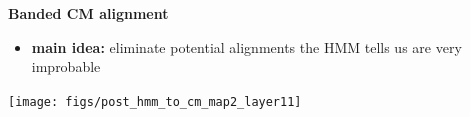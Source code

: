 \documentclass[landscape]{slides}
\begin{document}
\begin{slide}
\begin{center}
\large
\textbf{Banded CM alignment}
\end{center}
\medskip
\small
\begin{itemize}
\item
\textbf{main idea:} eliminate potential alignments the HMM tells us are very improbable
\end{itemize}
\begin{center}
\texttt{[image: figs/post\_hmm\_to\_cm\_map2\_layer11]}
\end{center}
\vfill
\end{slide}
\end{document}
